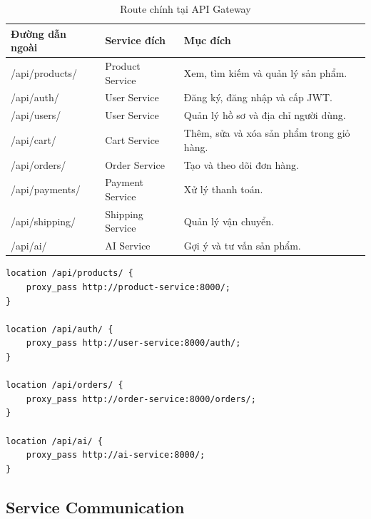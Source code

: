 \documentclass[../main.tex]{subfiles}
\begin{document}
\begin{table}[H]
    \centering
    \caption{Route chính tại API Gateway}
    \label{tab:chapter4-gateway-routes}
    \begin{tabular}{|p{}|p{}|p{}|}
        \hline
        \rowcolor{primary!35}
        \textbf{Đường dẫn ngoài} & \textbf{Service đích} & \textbf{Mục đích} \\
        \hline
        /api/products/ & Product Service & Xem, tìm kiếm và quản lý sản phẩm. \\
        \hline
        /api/auth/ & User Service & Đăng ký, đăng nhập và cấp JWT. \\
        \hline
        /api/users/ & User Service & Quản lý hồ sơ và địa chỉ người dùng. \\
        \hline
        /api/cart/ & Cart Service & Thêm, sửa và xóa sản phẩm trong giỏ hàng. \\
        \hline
        /api/orders/ & Order Service & Tạo và theo dõi đơn hàng. \\
        \hline
        /api/payments/ & Payment Service & Xử lý thanh toán. \\
        \hline
        /api/shipping/ & Shipping Service & Quản lý vận chuyển. \\
        \hline
        /api/ai/ & AI Service & Gợi ý và tư vấn sản phẩm. \\
        \hline
    \end{tabular}
\end{table}

\begin{lstlisting}[caption={Cấu hình route mẫu của API Gateway}, label={lst:chapter4-nginx-routes}]
location /api/products/ {
    proxy_pass http://product-service:8000/;
}

location /api/auth/ {
    proxy_pass http://user-service:8000/auth/;
}

location /api/orders/ {
    proxy_pass http://order-service:8000/orders/;
}

location /api/ai/ {
    proxy_pass http://ai-service:8000/;
}
\end{lstlisting}

\subsection{Service Communication}
\label{subsection:4.2.4}
\end{document}
